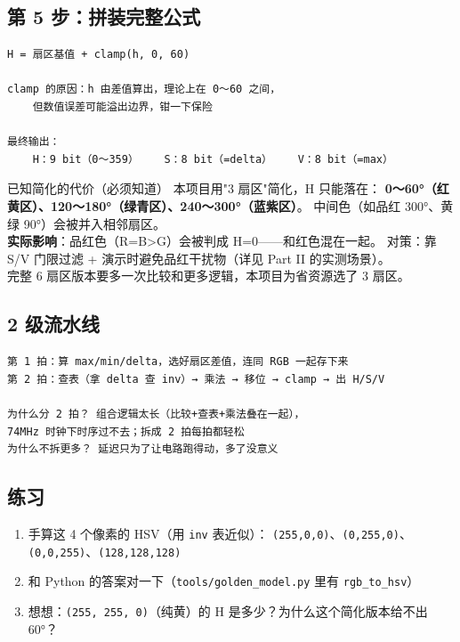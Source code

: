 \documentclass[11pt]{ctexart}
\newcommand{\code}[1]{\texttt{#1}}
\begin{document}
\subsection{第 5 步：拼装完整公式}

\begin{Verbatim}[frame=single,fontsize=\small]
H = 扇区基值 + clamp(h, 0, 60)

clamp 的原因：h 由差值算出，理论上在 0～60 之间，
    但数值误差可能溢出边界，钳一下保险

最终输出：
    H：9 bit（0～359）    S：8 bit（=delta）    V：8 bit（=max）
\end{Verbatim}

\begin{warnbox}{已知简化的代价（必须知道）}
本项目用"3 扇区"简化，H 只能落在：
\textbf{0～60°（红黄区）、120～180°（绿青区）、240～300°（蓝紫区）}。
中间色（如品红 300°、黄绿 90°）会被并入相邻扇区。\\[4pt]
\textbf{实际影响}：品红色（R=B>G）会被判成 H=0——和红色混在一起。
对策：靠 S/V 门限过滤 + 演示时避免品红干扰物（详见 Part II 的实测场景）。\\[4pt]
完整 6 扇区版本要多一次比较和更多逻辑，本项目为省资源选了 3 扇区。
\end{warnbox}

\subsection{2 级流水线}

\begin{Verbatim}[frame=single,fontsize=\small]
第 1 拍：算 max/min/delta，选好扇区差值，连同 RGB 一起存下来
第 2 拍：查表（拿 delta 查 inv）→ 乘法 → 移位 → clamp → 出 H/S/V

为什么分 2 拍？ 组合逻辑太长（比较+查表+乘法叠在一起），
74MHz 时钟下时序过不去；拆成 2 拍每拍都轻松
为什么不拆更多？ 延迟只为了让电路跑得动，多了没意义
\end{Verbatim}

\subsection{练习}

\begin{enumerate}
  \item 手算这 4 个像素的 HSV（用 \code{inv} 表近似）：
        \code{(255,0,0)}、\code{(0,255,0)}、\code{(0,0,255)}、\code{(128,128,128)}
  \item 和 Python 的答案对一下（\code{tools/golden\_model.py} 里有 \code{rgb\_to\_hsv}）
  \item 想想：\code{(255, 255, 0)}（纯黄）的 H 是多少？为什么这个简化版本给不出 60°？
\end{enumerate}
\end{document}
